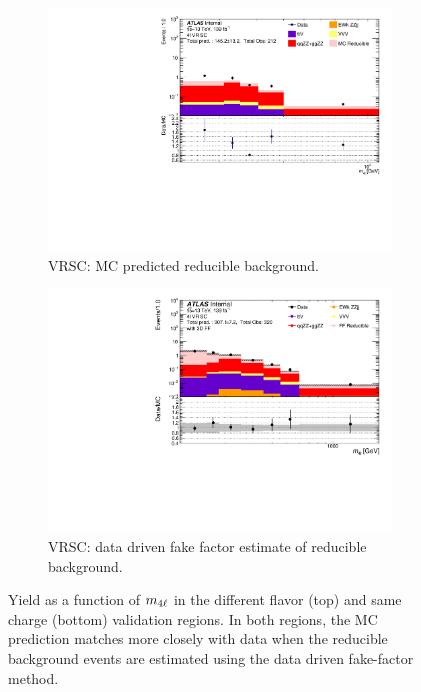 \begin{figure}[htb]
\begin{subfigure}{.48\textwidth}
        \includegraphics[width = 0.9\linewidth]{figures/Analysis/Background/Overlay_VRSC_MC_M4l.pdf}
        \caption{VRSC: MC predicted reducible background.\label{subfig:VRSCMCRed}}
    \end{subfigure}
    \begin{subfigure}{.48\textwidth}
        \centering
        \includegraphics[width = 0.9\linewidth]{figures/Analysis/Background/Overlay_VRSC_FFApplied_M4l.pdf}
	    \caption{VRSC: data driven fake factor estimate of reducible background.\label{subfig:VRSCFF}}
    \end{subfigure}
	
    \caption{ Yield as a function of $m_{4\ell}$ in the different flavor (top) and same charge (bottom) validation regions. In both regions, the MC prediction matches more closely with data when the reducible background events are estimated using the data driven fake-factor method. \label{fig:VRDataMCYield}}
\end{figure}

